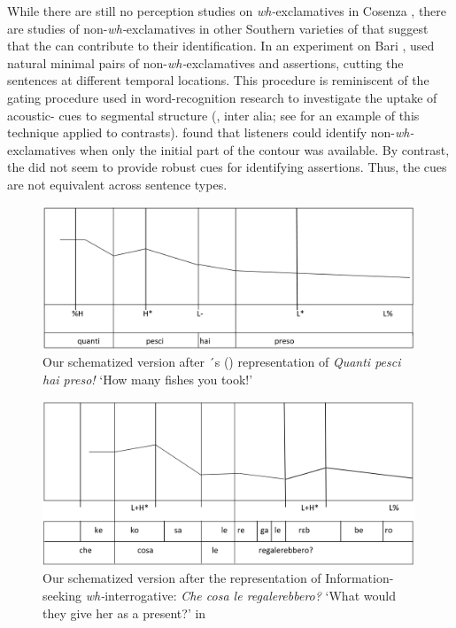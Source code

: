 \documentclass[output=paper]{langsci/langscibook}
\begin{document}
While there are still no perception studies on \textit{wh-}exclamatives in Cosenza , there are studies of non-\textit{wh-}exclamatives in other Southern varieties of  that suggest that the  can contribute to their identification. In an experiment on Bari , \citet{Sorianello2012} used natural minimal pairs of non-\textit{wh-}exclamatives and assertions, cutting the sentences at different temporal locations. This procedure is reminiscent of the gating procedure used in word-recognition research to investigate the uptake of acoustic- cues to segmental structure (\citealt{Grosjean1980,Lahiri1991}, inter alia; see \citealt{Petrone.2011} for an example of this technique applied to  contrasts). \citet{Sorianello2012} found that listeners could identify non-\textit{wh-}exclamatives when only the initial part of the contour was available. By contrast, the  did not seem to provide robust cues for identifying assertions. Thus, the  cues are not equivalent across sentence types. 

\begin{figure}

\includegraphics[width=0.99\textwidth]{figures/KEL-img1.PNG}
\caption{Our schematized version after \citeauthor{Sorianello2011exclamative}´s (\citeyear[316]{Sorianello2011exclamative}) representation of \textit{Quanti pesci hai preso!} ‘How many fishes you took!’}
\label{fig:kel:1}
\end{figure}


\begin{figure}
\includegraphics[width=0.99\textwidth]{figures/KEL-img2.PNG}
\caption{Our schematized version after the representation of Information-seeking \textit{wh-}interrogative: \textit{Che cosa le regalerebbero?} ‘What would they give her as a present?’ in \citep[182]{GiliFivelaETAL2015intonationalvariation}}
\label{fig:kel:2}
\end{figure}
\end{document}
